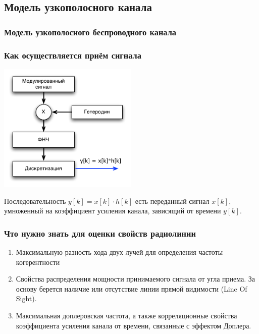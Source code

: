 \documentclass[utf8]{beamer}
\begin{document}
\subsection{Модель узкополосного канала}
\begin{frame}
\frametitle{Модель узкополосного беспроводного канала}
\frametitle{Как осуществляется приём сигнала}
\begin{center}
\includegraphics[width=0.5\textwidth]{pics/detection.pdf}
\end{center}
 Последовательность $y[k] = x[k]\cdot h[k]$  есть переданный сигнал $x[k]$, умноженный на коэффициент усиления канала, зависящий от времени $y[k]$.
\end{frame}
\begin{frame}
\frametitle{Что нужно знать для оценки свойств радиолинии}
\begin{enumerate}
        \item Максимальную разность хода двух лучей для определения частоты когерентности
        \item Свойства распределения мощности принимаемого сигнала от угла приема. За основу берется наличие или отсутствие линии прямой видимости (Line Of Sight).
        \item Максимальная доплеровская частота, а также корреляционные свойства коэффициента усиления канала от времени, связанные с эффектом Доплера.
\end{enumerate}
\end{frame}
\end{document}
